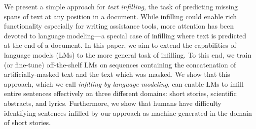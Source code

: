 We present a simple approach for \emph{text infilling}, the task of predicting missing spans of text at any position in a document. While infilling could enable rich functionality especially for writing assistance tools, more attention has been devoted to language modeling---a special case of infilling where text is predicted at the end of a document. In this paper, we aim to extend the capabilities of language models (LMs) to the more general task of infilling. To this end, we train (or fine-tune) off-the-shelf LMs on sequences containing the concatenation of artificially-masked text and the text which was masked. We show that this approach, which we call \emph{infilling by language modeling}, can enable LMs to infill entire sentences effectively on three different domains: short stories, scientific abstracts, and lyrics. Furthermore, we show that humans have difficulty identifying sentences infilled by our approach as machine-generated in the domain of short stories.